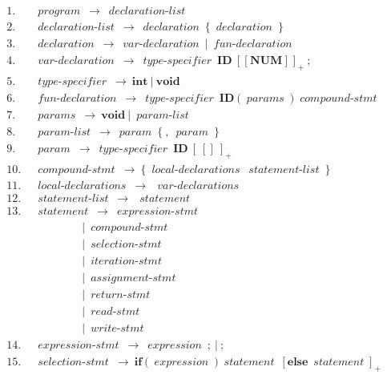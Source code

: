 \documentclass[a4paper,12pt]{report}
\newcommand{\varI}[1]{{\operatorname{\mathit{#1}}}}
\numberwithin{equation}{section}
\begin{document}
\begin{align*}
  1.~&~\varI{program}~\rightarrow~\varI{declaration-list} \\
  2.~&~\varI{declaration-list}~\rightarrow~\varI{declaration}~\{~\varI{declaration}~\} \\
  3.~&~\varI{declaration}~\rightarrow~\varI{var-declaration}~|~\varI{fun-declaration} \\
  4.~&~\varI{var-declaration}~\rightarrow~\varI{type-specifier}~\mathbf{ID}~[~\boldsymbol{[}~\mathbf{NUM}~\boldsymbol{]}~]_+~\boldsymbol{;} \\
  5.~&~\varI{type-specifier}~\rightarrow~\mathbf{int}~|~\mathbf{void} \\
  6.~&~\varI{fun-declaration}~\rightarrow~\varI{type-specifier}~\mathbf{ID}~\boldsymbol{(}~\varI{params}~\boldsymbol{)}~\varI{compound-stmt} \\
  7.~&~\varI{params}~\rightarrow~\mathbf{void}~|~\varI{param-list} \\
  8.~&~\varI{param-list}~\rightarrow~\varI{param}~\{~\boldsymbol{,}~\varI{param}~\} \\
  9.~&~\varI{param}~\rightarrow~\varI{type-specifier}~\mathbf{ID}~[~\boldsymbol{[]}~]_+ \\
  10.~&~\varI{compound-stmt}~\rightarrow~\boldsymbol{\{}~\varI{local-declarations}~\varI{statement-list}~\boldsymbol{\}} \\
  11.~&~\varI{local-declarations}~\rightarrow~{~\varI{var-declarations}~} \\
  12.~&~\varI{statement-list}~\rightarrow~{~\varI{statement}~} \\  
  13.~&~\varI{statement}~\rightarrow~\varI{expression-stmt}~ \\
      &~~~~~~~~~~~~~~~~~~~~|~\varI{compound-stmt}~ \\
      &~~~~~~~~~~~~~~~~~~~~|~\varI{selection-stmt}~ \\
      &~~~~~~~~~~~~~~~~~~~~|~\varI{iteration-stmt}~ \\
      &~~~~~~~~~~~~~~~~~~~~|~\varI{assignment-stmt}~ \\
      &~~~~~~~~~~~~~~~~~~~~|~\varI{return-stmt}~ \\
      &~~~~~~~~~~~~~~~~~~~~|~\varI{read-stmt}~ \\
      &~~~~~~~~~~~~~~~~~~~~|~\varI{write-stmt} \\
  14.~&~\varI{expression-stmt}~\rightarrow~\varI{expression}~\boldsymbol{;}~|~\boldsymbol{;} \\
  15.~&~\varI{selection-stmt}~\rightarrow~\mathbf{if}~\boldsymbol{(}~\varI{expression}~\boldsymbol{)}~\varI{statement}~[\mathbf{else}~\varI{statement}]_+ \\

\end{align*}
\end{document}
